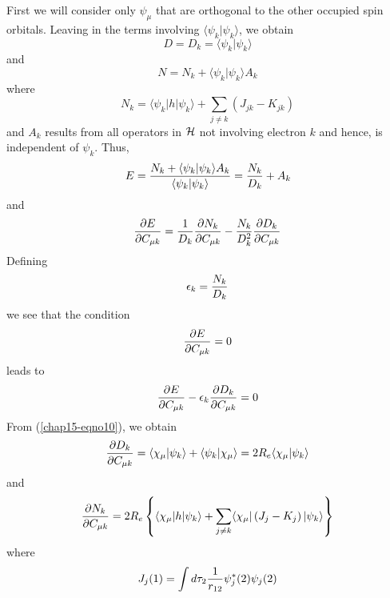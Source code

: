 First we will consider only $\psi_{\mu}$ that are orthogonal to the 
other occupied spin orbitals.  Leaving in the terms involving 
$\langle \psi_k | \psi_k \rangle$, we obtain
\begin{equation}
D = D_k = \langle \psi_k | \psi_k \rangle
\label{chap15-eqno10}
\end{equation}
and
\begin{equation}
N = N_k + \langle \psi_k | \psi_k \rangle A_k
\end{equation}
where
\begin{equation}
N_k = \langle \psi_k | h | \psi_k \rangle + \sum_{j \not= k} \left( 
J_{jk} - K_{jk} \right)
\end{equation}
and $A_k$ results from all operators in ${\cal H}$ not involving 
electron $k$ and hence, is independent of $\psi_k$. Thus,
\begin{equation}
E = {N_k + \langle \psi_k | \psi_k \rangle A_k \over \langle \psi_k | 
\psi_k \rangle} = {N_k \over D_k} + A_k
\end{equation}
and
\begin{equation}
{\partial E \over \partial C_{\mu k}} = {1 \over D_k} {\partial N_k 
\over \partial C_{\mu k}} - {N_k \over D^2_k} {\partial D_k \over 
\partial C_{\mu k}}
\end{equation}
Defining
\begin{equation}
\epsilon_k = {N_k \over D_k}
\label{chap15-eqno11}
\end{equation}
we see that the condition
\begin{equation}
{\partial E \over \partial C_{\mu k}} = 0
\end{equation}
leads to
\begin{equation}
{\partial E \over \partial C_{\mu k}} - \epsilon_k  {\partial D_k 
\over \partial C_{\mu k}} = 0
\end{equation}
From (\ref{chap15-eqno10}), we obtain
\begin{equation}
{\partial D_k \over \partial C_{\mu k}} = \langle \chi_{\mu} | \psi_k 
\rangle + \langle \psi_k | \chi_{\mu} \rangle = 2 R_e \langle 
\chi_{\mu} | \psi_k \rangle
\label{chap15-eqno12}
\end{equation}
and
\begin{equation}
{\partial N_k \over \partial C_{\mu k}} = 2 R_e \left\{ \langle 
\chi_{\mu} | h | \psi_k \rangle + \sum_{j \not= k} \langle 
\chi_{\mu} | \left( J_j - K_j \right) | \psi_k \rangle
\right\}
\label{chap15-eqno13}
\end{equation}
where
\begin{equation}
J_j (1) = \int d \tau_2 {1 \over r_{12}} \psi^*_j (2) \psi_j(2)
\end{equation}
